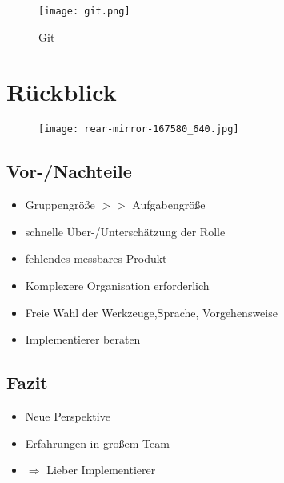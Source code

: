 \documentclass[ignorenonframetext, 11pt, table]{beamer}
\begin{document}
\begin{frame}
\begin{figure}
   \centering
   \texttt{[image: git.png]}
   \caption{Git}
\end{figure}
\end{frame}
\section{Rückblick}
\begin{frame}
\begin{figure}
\centering
\texttt{[image: rear-mirror-167580\_640.jpg]}
\end{figure}
\end{frame}
\subsection{Vor-/Nachteile}
\begin{frame}
\begin{itemize}[label=-]
    \item<1-> Gruppengröße $>>$ Aufgabengröße 
    \item<2-> schnelle Über-/Unterschätzung der Rolle
    \item<3-> fehlendes messbares Produkt 
\end{itemize}
\begin{itemize}[label=+]
    \item<4-> Komplexere Organisation erforderlich 
    \item<5-> Freie Wahl der Werkzeuge,Sprache, Vorgehensweise
    \item<6-> Implementierer beraten
\end{itemize}
\end{frame}
\subsection{Fazit}
\begin{frame}
\begin{itemize}
    \item<1-> Neue Perspektive
    \item<2-> Erfahrungen in großem Team
    \item<3-> $\Rightarrow$ Lieber Implementierer
\end{itemize}
\end{frame}
\end{document}
